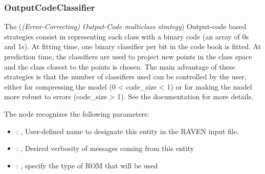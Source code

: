 \subsubsection{OutputCodeClassifier}
  The  (\textit{(Error-Correcting) Output-Code multiclass strategy})
  Output-code based strategies consist in representing each class with a binary code (an array of
  0s and 1s). At fitting time, one binary classifier per bit in the code book is fitted. At
  prediction time, the classifiers are used to project new points in the class space and the class
  closest to the points is chosen. The main advantage of these strategies is that the number of
  classifiers used can be controlled by the user, either for compressing the model
  (0 < code\_size < 1) or for making the model more robust to errors (code\_size > 1). See the
  documentation for more details.

  The  node recognizes the following parameters:
    \begin{itemize}
      \item {}: , 
        User-defined name to designate this entity in the RAVEN input file.
      \item {}: , 
        Desired verbosity of messages coming from this entity
      \item {}: , 
        specify the type of ROM that will be used
  \end{itemize}

